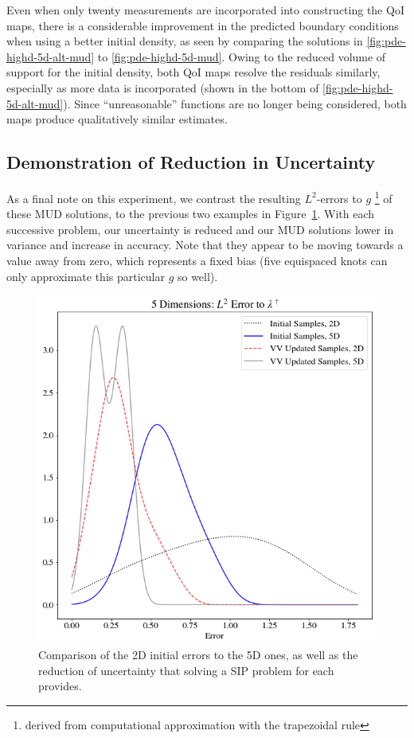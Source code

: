 Even when only twenty measurements are incorporated into constructing the QoI maps, there is a considerable improvement in the predicted boundary conditions when using a better initial density, as seen by comparing the solutions in \ref{fig:pde-highd-5d-alt-mud} to \ref{fig:pde-highd-5d-mud}.
Owing to the reduced volume of support for the initial density, both QoI maps resolve the residuals similarly, especially as more data is incorporated (shown in the bottom of \ref{fig:pde-highd-5d-alt-mud}).
Since ``unreasonable'' functions are no longer being considered, both maps produce qualitatively similar estimates.

\subsection{Demonstration of Reduction in Uncertainty}
As a final note on this experiment, we contrast the resulting $L^2$-errors to $g$ \footnote{derived from computational approximation with the trapezoidal rule} of these MUD solutions, to the previous two examples in Figure~\ref{fig:pde-highd-5d-hist}.
With each successive problem, our uncertainty is reduced and our MUD solutions lower in variance and increase in accuracy.
Note that they appear to be moving towards a value away from zero, which represents a fixed bias (five equispaced knots can only approximate this particular $g$ so well).

\begin{figure}
\centering
  \includegraphics[width=0.675\linewidth]{figures/pde-highd/pde-highd_hist_D5_t5-0E-01}
\caption{
Comparison of the 2D initial errors to the 5D ones, as well as the reduction of uncertainty that solving a SIP problem for each provides.
}
\label{fig:pde-highd-5d-hist}
\end{figure}
